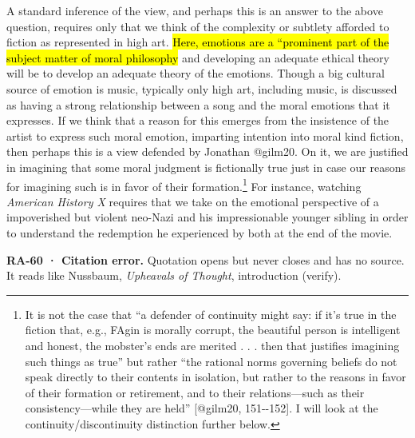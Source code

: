 \documentclass[
  letterpaper,
  DIV=11,
  numbers=noendperiod]{scrartcl}
\theoremstyle{remark}
\begin{document}
A standard inference of the view, and perhaps this is an answer to the
above question, requires only that we think of the complexity or
subtlety afforded to fiction as represented in high art. \hl{Here,
emotions are a ``prominent part of the subject matter of moral
philosophy} and developing an adequate ethical theory will be to develop
an adequate theory of the emotions. Though a big cultural source of
emotion is music, typically only high art, including music, is discussed
as having a strong relationship between a song and the moral emotions
that it expresses. If we think that a reason for this emerges from the
insistence of the artist to express such moral emotion, imparting
intention into moral kind fiction, then perhaps this is a view defended
by Jonathan @gilm20. On it, we are justified in imagining that some
moral judgment is fictionally true just in case our reasons for
imagining such is in favor of their formation.\footnote{It is not the
  case that ``a defender of continuity might say: if it's true in the
  fiction that, e.g., FAgin is morally corrupt, the beautiful person is
  intelligent and honest, the mobster's ends are merited . . . then that
  justifies imagining such things as true'' but rather ``the rational
  norms governing beliefs do not speak directly to their contents in
  isolation, but rather to the reasons in favor of their formation or
  retirement, and to their relations---such as their consistency---while
  they are held'' {[}@gilm20, 151-\/-152{]}. I will look at the
  continuity/discontinuity distinction further below.} For instance,
watching \emph{American History X} requires that we take on the
emotional perspective of a impoverished but violent neo-Nazi and his
impressionable younger sibling in order to understand the redemption he
experienced by both at the end of the movie.

\begin{tcolorbox}[enhanced jigsaw, arc=.35mm, bottomrule=.15mm, bottomtitle=1mm, breakable, colback=white, colbacktitle=quarto-callout-warning-color!10!white, colframe=quarto-callout-warning-color-frame, coltitle=black, left=2mm, leftrule=.75mm, opacityback=0, opacitybacktitle=0.6, rightrule=.15mm, title=\textcolor{quarto-callout-warning-color}{\faExclamationTriangle}\hspace{0.5em}{Warning}, titlerule=0mm, toprule=.15mm, toptitle=1mm]

\textbf{RA-60 · Citation error.} Quotation opens but never closes and
has no source. It reads like Nussbaum, \emph{Upheavals of Thought},
introduction (verify).

\end{tcolorbox}
\end{document}
